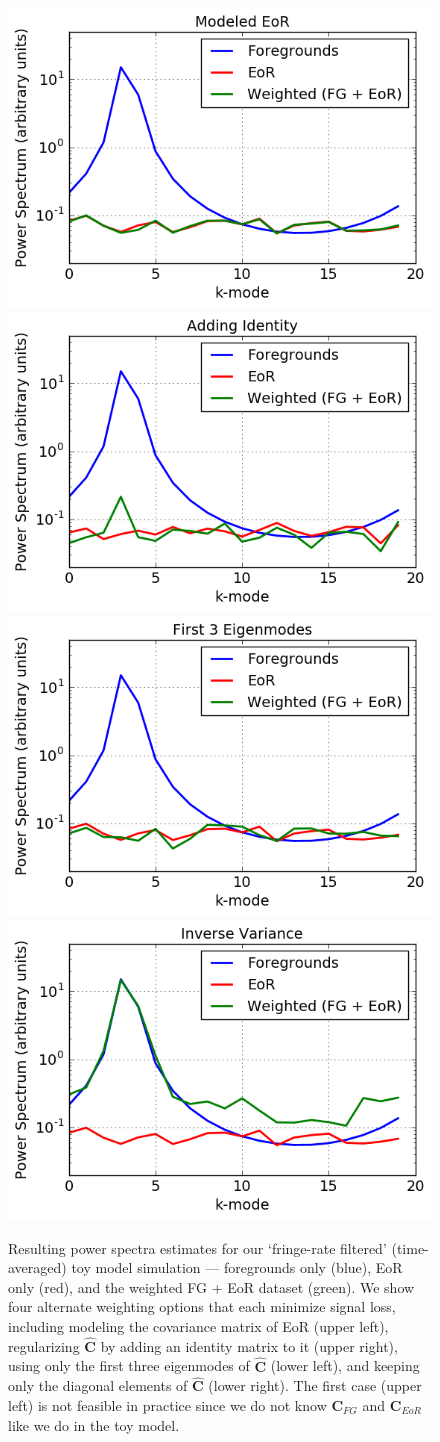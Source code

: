 \documentclass[preprint2,numberedappendix,tighten]{aastex6}  %
\begin{document}
\begin{figure}
	\centering
	\includegraphics[trim={0cm 0cm 0cm 0cm},clip,height=0.3\textwidth]{plots/toy_sigloss10.png}
	\includegraphics[trim={0cm 0cm 0cm 0cm},clip,height=0.3\textwidth]{plots/toy_sigloss8.png}
	\includegraphics[trim={0cm 0cm 0cm 0cm},clip,height=0.3\textwidth]{plots/toy_sigloss9.png}
	\includegraphics[trim={0cm 0cm 0cm 0cm},clip,height=0.3\textwidth]{plots/toy_sigloss11.png}
	\caption{Resulting power spectra estimates for our `fringe-rate filtered' (time-averaged) toy model simulation --- foregrounds only (blue), 
EoR only (red), and the weighted FG + EoR dataset (green). We show four alternate weighting options that each minimize signal 
loss, including modeling the covariance matrix of EoR (upper left), regularizing $\widehat{\textbf{C}}$ by adding an identity matrix to 
it (upper right), using only the first three eigenmodes of $\widehat{\textbf{C}}$ (lower left), and keeping only the diagonal elements of 
$\widehat{\textbf{C}}$ (lower right). The first case (upper left) is not feasible in practice since we do not know $\textbf{C}_{FG}$ and $\textbf{C}_{EoR}$ like we do in the toy model.}
	\label{fig:toy_sigloss8}
\end{figure}
\end{document}
